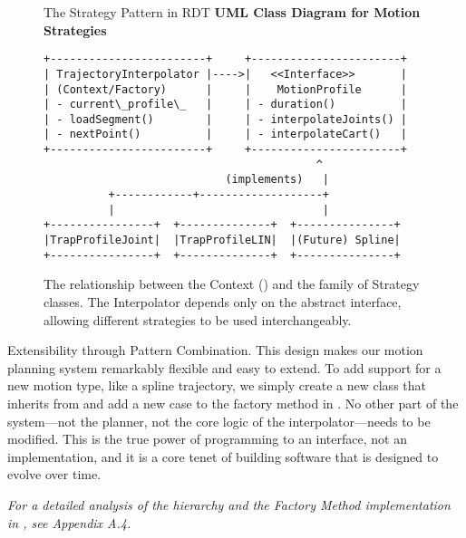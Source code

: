 \begin{figure}[h!]
\centering
\begin{infobox}{The Strategy Pattern in RDT}
\textbf{UML Class Diagram for Motion Strategies}
\begin{verbatim}
+------------------------+     +-----------------------+ 
| TrajectoryInterpolator |---->|   <<Interface>>       | 
| (Context/Factory)      |     |    MotionProfile      | 
| - current\_profile\_   |     | - duration()          | 
| - loadSegment()        |     | - interpolateJoints() | 
| - nextPoint()          |     | - interpolateCart()   | 
+------------------------+     +-----------------------+ 
                                          ^ 
                            (implements)   | 
          +------------+-------------------+ 
          |                                |                             
+----------------+  +--------------+  +---------------+
|TrapProfileJoint|  |TrapProfileLIN|  |(Future) Spline|
+----------------+  +--------------+  +---------------+
\end{verbatim}    
\end{infobox}
\caption{The relationship between the Context () and the family of Strategy classes. The Interpolator depends only on the abstract  interface, allowing different strategies to be used interchangeably.}
\label{fig:strategy_pattern_conceptual}
\end{figure}

\begin{principlebox}{Extensibility through Pattern Combination.}
    This design makes our motion planning system remarkably flexible and easy to extend. To add support for a new motion type, like a spline trajectory, we simply create a new  class that inherits from  and add a new case to the factory method in . No other part of the system—not the planner, not the core logic of the interpolator—needs to be modified. This is the true power of programming to an interface, not an implementation, and it is a core tenet of building software that is designed to evolve over time.

    \vspace{1em} %
    \textit{For a detailed analysis of the  hierarchy and the Factory Method implementation in , see Appendix A.4.}
\end{principlebox}

